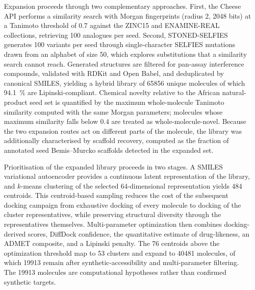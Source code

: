 Expansion proceeds through two complementary approaches. First, the Cheese API\cite{lzicar_cheese_2024} performs a similarity search with Morgan fingerprints (radius \num{2}, \num{2048} bits) at a Tanimoto threshold of \num{0.7} against the ZINC15 and ENAMINE-REAL collections, retrieving \num{100} analogues per seed. Second, STONED-SELFIES\cite{Nigam2021} generates \num{100} variants per seed through single-character SELFIES mutations drawn from an alphabet of size \num{50}, which explores substitutions that a similarity search cannot reach. Generated structures are filtered for pan-assay interference compounds, validated with RDKit and Open Babel, and deduplicated by canonical SMILES, yielding a hybrid library of \num{65856} unique molecules of which \qty{94.1}{\percent} are Lipinski-compliant. Chemical novelty relative to the African natural-product seed set is quantified by the maximum whole-molecule Tanimoto similarity computed with the same Morgan parameters; molecules whose maximum similarity falls below \num{0.4} are treated as whole-molecule-novel. Because the two expansion routes act on different parts of the molecule, the library was additionally characterised by scaffold recovery, computed as the fraction of annotated seed Bemis--Murcko scaffolds detected in the expanded set.

Prioritisation of the expanded library proceeds in two stages. A SMILES variational autoencoder\cite{gomez2018automatic} provides a continuous latent representation of the library, and $k$-means clustering of the selected \num{64}-dimensional representation yields \num{484} centroids. This centroid-based sampling reduces the cost of the subsequent docking campaign from exhaustive docking of every molecule to docking of the cluster representatives, while preserving structural diversity through the representatives themselves. Multi-parameter optimization then combines docking-derived scores, DiffDock confidence, the quantitative estimate of drug-likeness, an ADMET composite, and a Lipinski penalty. The \num{76} centroids above the optimization threshold map to \num{53} clusters and expand to \num{40481} molecules, of which \num{19913} remain after synthetic-accessibility and multi-parameter filtering. The \num{19913} molecules are computational hypotheses rather than confirmed synthetic targets.

